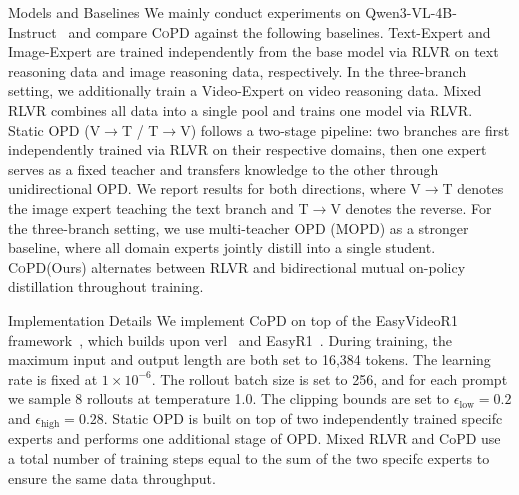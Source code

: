 \documentclass{llmxive}
\providecommand{\method}{\textsc{CoPD}\xspace}
\begin{document}
{Models and Baselines} We mainly conduct experiments on Qwen3-VL-4B-Instruct~\cite{bai2025qwen3vltechnicalreport} and compare \method against the following baselines. Text-Expert and Image-Expert are trained independently from the base model via RLVR on text reasoning data and image reasoning data, respectively. In the three-branch setting, we additionally train a Video-Expert on video reasoning data. Mixed 
RLVR combines all data into a single pool and trains one model via RLVR. Static OPD (V$\to$T / T$\to$V) follows a two-stage pipeline: two branches are first independently trained via RLVR on their respective domains, then one expert serves as a fixed teacher and transfers knowledge to the other through unidirectional OPD. We report results for both directions, where V$\to$T denotes the image expert teaching the text branch and T$\to$V denotes the reverse. For the three-branch setting, we use multi-teacher OPD (MOPD) as a stronger baseline, where all domain experts jointly distill into a single student. \method (Ours) alternates between RLVR and bidirectional mutual on-policy distillation throughout training.

{Implementation Details} We implement CoPD on top of the EasyVideoR1 framework~\cite{qin2026easyvideor1easierrlvideo}, which builds upon verl~\cite{sheng2024hybridflow} and EasyR1~\cite{zheng2025easyr1}. During training, the maximum input and output length are both set to 16,384 tokens. The learning rate is fixed at $1 \times 10^{-6}$. The rollout batch size is set to 256, and for each prompt we sample 8 rollouts at temperature 1.0. The clipping bounds are set to $\epsilon_{\text{low}} = 0.2$ and $\epsilon_{\text{high}} = 0.28$. Static OPD is built on top of two independently trained specifc experts and performs one additional stage of OPD. Mixed RLVR and CoPD use a total number of training steps equal to the sum of the two specifc experts to ensure the same data throughput. 
\end{document}

